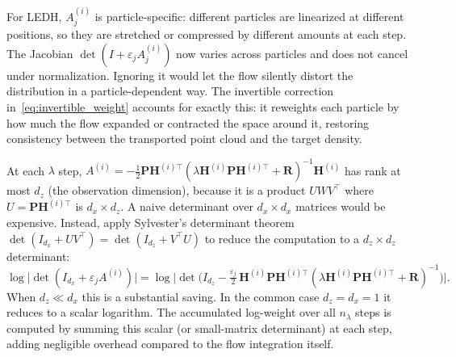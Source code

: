 \documentclass{article}
\begin{document}
For LEDH, $A^{(i)}_j$ is particle-specific: different particles are linearized at different positions, so they are stretched or compressed by different amounts at each step. The Jacobian $\det(I + \varepsilon_j A^{(i)}_j)$ now varies across particles and does not cancel under normalization. Ignoring it would let the flow silently distort the distribution in a particle-dependent way. The invertible correction in~\eqref{eq:invertible_weight} accounts for exactly this: it reweights each particle by how much the flow expanded or contracted the space around it, restoring consistency between the transported point cloud and the target density.


At each $\lambda$ step, $A^{(i)} = -\tfrac{1}{2}\mathbf{P}\mathbf{H}^{(i)\top}(\lambda\mathbf{H}^{(i)}\mathbf{P}\mathbf{H}^{(i)\top}+\mathbf{R})^{-1}\mathbf{H}^{(i)}$ has rank at most $d_z$ (the observation dimension), because it is a product $UW V^\top$ where $U = \mathbf{P}\mathbf{H}^{(i)\top}$ is $d_x \times d_z$. A naive determinant over $d_x \times d_x$ matrices would be expensive. Instead, apply Sylvester's determinant theorem $\det(I_{d_x} + UV^\top) = \det(I_{d_z} + V^\top U)$ to reduce the computation to a $d_z \times d_z$ determinant:
\begin{equation}
    \log\bigl|\det(I_{d_x} + \varepsilon_j A^{(i)})\bigr|
    = \log\bigl|\det\!\bigl(I_{d_z} - \tfrac{\varepsilon_j}{2}\,\mathbf{H}^{(i)}\mathbf{P}\mathbf{H}^{(i)\top}(\lambda\mathbf{H}^{(i)}\mathbf{P}\mathbf{H}^{(i)\top}+\mathbf{R})^{-1}\bigr)\bigr|.
\end{equation}
When $d_z \ll d_x$ this is a substantial saving. In the common case $d_z = d_x = 1$ it reduces to a scalar logarithm. The accumulated log-weight over all $n_\lambda$ steps is computed by summing this scalar (or small-matrix determinant) at each step, adding negligible overhead compared to the flow integration itself.
\end{document}
